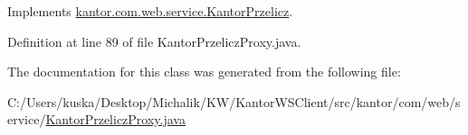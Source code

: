 Implements \hyperlink{classkantor_1_1com_1_1web_1_1service_1_1_kantor_przelicz_ad263683559db773d4ccb28e14090824f}{kantor.\+com.\+web.\+service.\+Kantor\+Przelicz}.



Definition at line 89 of file Kantor\+Przelicz\+Proxy.\+java.



The documentation for this class was generated from the following file\+:\begin{DoxyCompactItemize}
\item 
C\+:/\+Users/kuska/\+Desktop/\+Michalik/\+K\+W/\+Kantor\+W\+S\+Client/src/kantor/com/web/service/\hyperlink{_kantor_przelicz_proxy_8java}{Kantor\+Przelicz\+Proxy.\+java}\end{DoxyCompactItemize}
